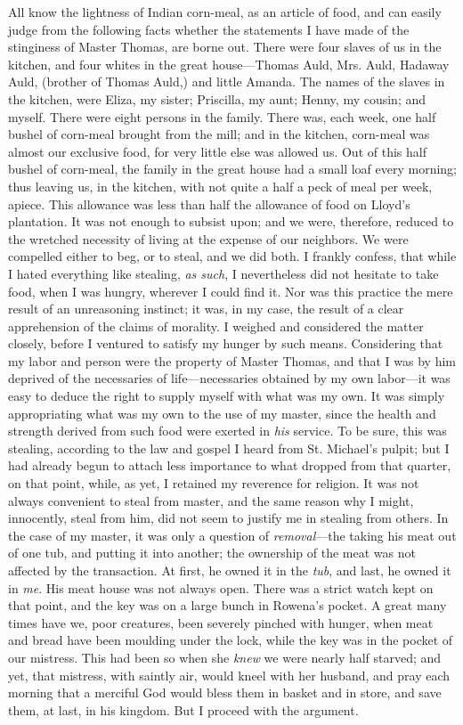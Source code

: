 All know the lightness of Indian corn-meal, as an article of food, and
can easily judge from the following facts whether the statements I have
made of the stinginess of Master Thomas, are borne out. There were four
slaves of us in the kitchen, and four whites in the great house---Thomas
Auld, Mrs. Auld, Hadaway Auld, (brother of Thomas Auld,) and little
Amanda. The names of the slaves in the kitchen, were Eliza, my sister;
Priscilla, my aunt; Henny, my cousin; and myself. There were eight
persons in the family. There was, each week, one half bushel of
corn-meal brought from the mill; and in the kitchen, corn-meal was
almost our exclusive food, for very little else was allowed us. Out of
this half bushel of corn-meal, the family in the great house had a small
loaf every morning; thus leaving us, in the kitchen, with not quite a
half a peck of meal per week, apiece. This allowance was less than half
the allowance of food on Lloyd's plantation. It was not enough to
subsist upon; and we were, therefore, reduced to the wretched necessity
of living at the expense of our neighbors. We were compelled either to
beg, or to steal, and we did both. I frankly confess, that while {}I
hated everything like stealing, \emph{as such}, I nevertheless did not
hesitate to take food, when I was hungry, wherever I could find it. Nor
was this practice the mere result of an unreasoning instinct; it was, in
my case, the result of a clear apprehension of the claims of morality. I
weighed and considered the matter closely, before I ventured to satisfy
my hunger by such means. Considering that my labor and person were the
property of Master Thomas, and that I was by him deprived of the
necessaries of life---necessaries obtained by my own labor---it was easy
to deduce the right to supply myself with what was my own. It was simply
appropriating what was my own to the use of my master, since the health
and strength derived from such food were exerted in \emph{his} service.
To be sure, this was stealing, according to the law and gospel I heard
from St. Michael's pulpit; but I had already begun to attach less
importance to what dropped from that quarter, on that point, while, as
yet, I retained my reverence for religion. It was not always convenient
to steal from master, and the same reason why I might, innocently, steal
from him, did not seem to justify me in stealing from others. In the
case of my master, it was only a question of \emph{removal}---the taking
his meat out of one tub, and putting it into another; the ownership of
the meat was not affected by the transaction. At first, he owned it in
the \emph{tub}, and last, he owned it in \emph{me}. His meat house was
not always open. There was a strict watch kept on that point, and the
key was on a large bunch in Rowena's pocket. A great many times have we,
poor creatures, been severely pinched with hunger, {}when meat and bread
have been moulding under the lock, while the key was in the pocket of
our mistress. This had been so when she \emph{knew} we were nearly half
starved; and yet, that mistress, with saintly air, would kneel with her
husband, and pray each morning that a merciful God would bless them in
basket and in store, and save them, at last, in his kingdom. But I
proceed with the argument.

